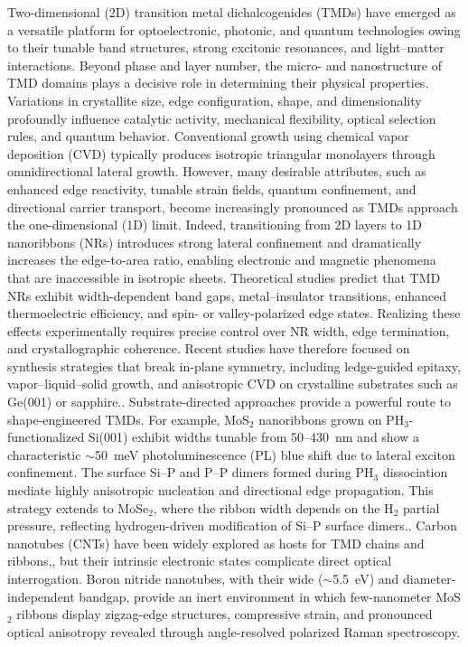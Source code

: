 \documentclass[journal=jacsnano,manuscript=article]{achemso}
\begin{document}
Two-dimensional (2D) transition metal dichalcogenides (TMDs) have emerged as a versatile platform for optoelectronic, photonic, and quantum technologies owing to their tunable band structures, strong excitonic resonances, and light–matter interactions.\cite{Zhang2019, Zhang2020} Beyond phase and layer number, the micro- and nanostructure of TMD domains plays a decisive role in determining their physical properties. Variations in crystallite size, edge configuration, shape, and dimensionality profoundly influence catalytic activity, mechanical flexibility, optical selection rules, and quantum behavior.\cite{XZhang2019CVD2D, XZhang2021HTS2D, QiangVLSWS22021} Conventional growth using chemical vapor deposition (CVD) typically produces isotropic triangular monolayers through omnidirectional lateral growth. However, many desirable attributes, such as enhanced edge reactivity, tunable strain fields, quantum confinement, and directional carrier transport, become increasingly pronounced as TMDs approach the one-dimensional (1D) limit. Indeed, transitioning from 2D layers to 1D nanoribbons (NRs) introduces strong lateral confinement and dramatically increases the edge-to-area ratio, enabling electronic and magnetic phenomena that are inaccessible in isotropic sheets. Theoretical studies predict that TMD NRs exhibit width-dependent band gaps,\cite{Dolui2012} metal–insulator transitions,\cite{He2017} enhanced thermoelectric efficiency\cite{Zhang2016}, and spin- or valley-polarized edge states.\cite{Cheng2017} Realizing these effects experimentally requires precise control over NR width, edge termination, and crystallographic coherence. Recent studies have therefore focused on synthesis strategies that break in-plane symmetry, including ledge-guided epitaxy, vapor–liquid–solid growth, and anisotropic CVD on crystalline substrates such as Ge(001) or sapphire.\cite{Aljarb2020, Li2021}. Substrate-directed approaches provide a powerful route to shape-engineered TMDs. For example, MoS\(_2\) nanoribbons grown on PH\(_3\)-functionalized Si(001) exhibit widths tunable from 50–430~nm and show a characteristic $\sim$50~meV photoluminescence (PL) blue shift due to lateral exciton confinement\cite{ChowdhuryNature}. The surface Si–P and P–P dimers formed during PH\(_3\) dissociation mediate highly anisotropic nucleation and directional edge propagation. This strategy extends to MoSe\(_2\), where the ribbon width depends on the H\(_2\) partial pressure, reflecting hydrogen-driven modification of Si–P surface dimers.\cite{ChowdhuryNature}. Carbon nanotubes (CNTs) have been widely explored as hosts for TMD chains and ribbons,\cite{Tanaka2025,Miakota2023MoS2NR,G_Ghimire}, but their intrinsic electronic states complicate direct optical interrogation. Boron nitride nanotubes, with their wide ($\sim$5.5~eV) and diameter-independent bandgap, provide an inert environment in which few-nanometer MoS\(_2\) ribbons display zigzag-edge structures, compressive strain, and pronounced optical anisotropy revealed through angle-resolved polarized Raman spectroscopy.\cite{Tanaka2025}
\end{document}
